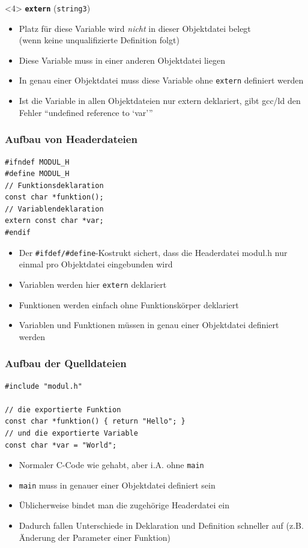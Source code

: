 \documentclass{slides}
\begin{document}
\begin{frame}[fragile]
  \begin{onlyenv}<4>
    {\alerted\bfseries \lstinline!extern!} (\lstinline!string3!)
    \begin{itemize}
    \item Platz für diese Variable wird \emph{nicht} in dieser Objektdatei belegt\\
      (wenn keine unqualifizierte Definition folgt)
    \item Diese Variable muss in einer anderen Objektdatei liegen
    \item In genau einer Objektdatei muss diese Variable ohne \lstinline!extern!  definiert werden
    \item Ist die Variable in allen Objektdateien nur extern deklariert, gibt
      gcc/ld den Fehler "`undefined reference to `var'"'
    \end{itemize}
  \end{onlyenv}
\end{frame}

\begin{frame}[fragile]
  \frametitle{Aufbau von Headerdateien}
\begin{lstlisting}[title=modul.h]
#ifndef MODUL_H
#define MODUL_H
// Funktionsdeklaration
const char *funktion();
// Variablendeklaration
extern const char *var;
#endif
\end{lstlisting}

  \begin{itemize}
  \item Der \lstinline!#ifdef/#define!-Kostrukt sichert, dass die Headerdatei modul.h nur einmal
    pro Objektdatei eingebunden wird
  \item Variablen werden hier \lstinline!extern! deklariert
  \item Funktionen werden einfach ohne Funktionskörper deklariert
  \item Variablen und Funktionen müssen in genau einer Objektdatei definiert werden
  \end{itemize}
\end{frame}

\begin{frame}[fragile]
  \frametitle{Aufbau der Quelldateien}
\begin{lstlisting}[title=modul.c]
#include "modul.h"

// die exportierte Funktion
const char *funktion() { return "Hello"; }
// und die exportierte Variable
const char *var = "World";
\end{lstlisting}

  \begin{itemize}
  \item Normaler C-Code wie gehabt, aber i.A. ohne \lstinline!main!
  \item \lstinline!main! muss in genauer einer Objektdatei definiert sein
  \item Üblicherweise bindet man die zugehörige Headerdatei ein
  \item Dadurch fallen Unterschiede in Deklaration und Definition schneller auf
    (z.B. Änderung der Parameter einer Funktion)
  \end{itemize}
\end{frame}
\end{document}
